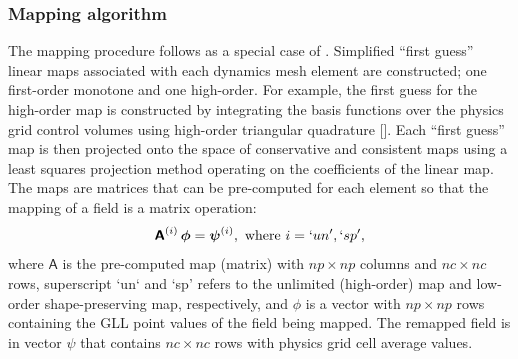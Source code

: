 \documentclass[twocol]{ametsoc}
\begin{document}
\subsubsection{Mapping algorithm}  The mapping procedure follows as a special case of \citet{UT2015MWR}.  Simplified ``first guess'' linear maps associated with each dynamics mesh element are constructed; one first-order monotone and one high-order. For example, the first guess for the high-order map is constructed by integrating the basis functions over the physics grid control volumes using high-order triangular quadrature [{\color{red}{paul: what are we using here?}}]. Each ``first guess'' map is then projected onto the space of conservative and consistent maps using a least squares projection method operating on the coefficients of the linear map. The maps are matrices that can be pre-computed for each element so that the mapping of a field is a matrix operation:
\begin{equation}
\bm{\mathsf{A}}^{(i)}\, \bm{\mathsf{\phi}}=\bm{\mathsf{\psi}}^{(i)},\text{ where }i=`un',`sp', 
\end{equation}
where $\bm{\mathsf{A}}$ is the pre-computed map (matrix) with $np\times np$ columns and $nc\times nc$ rows, superscript `un` and `sp' refers to the unlimited (high-order) map and low-order shape-preserving map, respectively, and $\bm{\mathsf{\phi}}$ is a vector with $np\times np$ rows containing the GLL point values of the field being mapped. The remapped field is in vector $\bm{\mathsf{\psi}}$ that contains $nc\times nc$ rows with physics grid cell average values.
\end{document}

